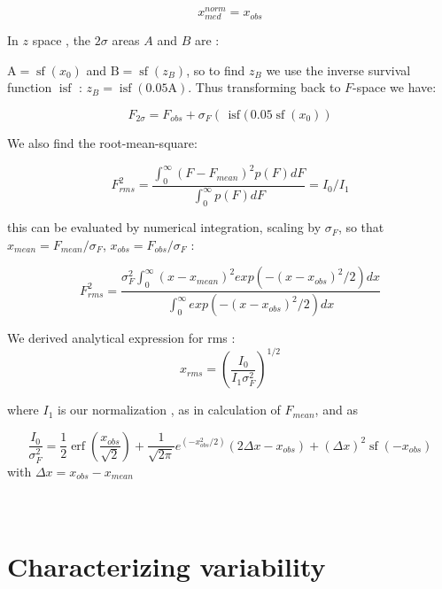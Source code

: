 \documentclass[fleqn,usenatbib]{mnras}  %
\DeclareMathOperator\erf{erf}
\DeclareMathOperator\sf{sf}
\DeclareMathOperator\isf{isf}
\begin{document}
\begin{equation}
x_{med}^{norm} = x_{obs}
\end{equation}


\bigskip

In $z$  space , the $2\sigma$ areas  $A$ and $B$ are :

$\text{A} = \sf(x_{0})$ and $\text{B} = \sf(z_{B})$, so to find  $z_{B}$ we use the  inverse survival function $\isf$ : $z_{B} = \isf(0.05 \text{A})$. Thus transforming back to $F$-space we have:

\begin{equation}
F_{2\sigma} = F_{obs} + \sigma_{F} \left(\, \isf (\, 0.05 \sf (x_{0})  \right)
\end{equation}

\bigskip

We also find the root-mean-square:

\begin{equation}
F_{rms}^{2} = \frac{\int _{0} ^ {\infty}{(F-F_{mean})^{2} p(F) dF}}{\int _{0} ^ {\infty}{p(F) dF}} = I_{0} / I_{1}
\end{equation}

this can be evaluated by numerical integration, scaling by $\sigma_{F}$, so that $x_{mean} = F_{mean} / \sigma_{F}$, $x_{obs} = F_{obs} / \sigma_{F}$ : 

\begin{equation}
F_{rms}^{2} = \frac{\sigma_{F}^{2} \int_{0}^{\infty} {(x-x_{mean})^{2} exp(-(x-x_{obs})^{2} / 2 ) dx }}  {\int_{0}^{\infty} {exp(-(x-x_{obs})^{2} / 2 ) dx }}
\end{equation}

We derived analytical expression for rms :
\begin{equation}
x_{rms} = \left(\frac{I_{0}}{I_{1} \sigma_{F}^{2}}\right)^{1/2}
\end{equation}

where $I_{1}$ is our normalization , as in calculation of $F_{mean}$, and as 


\begin{equation}
\frac{I_{0}}{ \sigma_{F}^{2}} = \frac{1}{2} \erf\left(\frac{x_{obs}}{\sqrt{2}}\right) + \frac{1}{\sqrt{2\pi}} e^{(-x_{obs}^{2} / 2)} (2 \Delta x - x_{obs}) + (\Delta x)^{2} \sf(-x_{obs})
\end{equation}
with  $\Delta x = x_{obs} - x_{mean}$

\section{\\ Characterizing variability}
\label{App:AppendixB}
\end{document}
